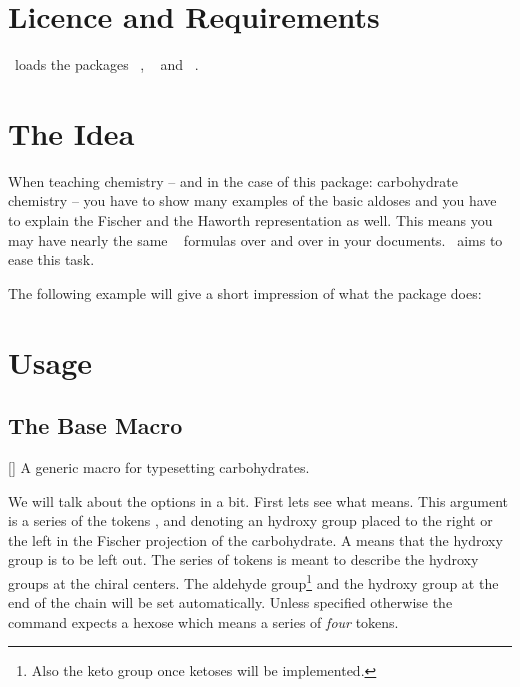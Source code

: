 \documentclass[load-preamble+]{cnltx-doc}
\begin{document}
\section{Licence and Requirements}
\license

\carbohydrates\ loads the packages ~\cite{pkg:chemfig},
~\cite{pkg:etoolbox} and ~\cite{pkg:xcolor}.

\section{The Idea}
When teaching chemistry -- and in the case of this package: carbohydrate
chemistry -- you have to show many examples of the basic aldoses and you have
to explain the Fischer and the Haworth representation as well. This means you
may have nearly the same ~\cite{pkg:chemfig} formulas over and
over in your documents.  \carbohydrates\ aims to ease this task.

The following example will give a short impression of what the package does:
\begin{example}
  \glucose
  \glucose[model={fischer=skeleton}]
  \setatomsep{2.5em}
  \glucose[model=haworth,ring]
  \glucose[model=haworth,ring=furanose]
\end{example}

\section{Usage}
\subsection{The Base Macro}
\begin{commands}
  []
    A generic macro for typesetting carbohydrates.
\end{commands}
We will talk about the options in a bit. First lets see what 
means.  This argument is a series of the tokens ,  and
 denoting an hydroxy group placed to the right or the left in the
Fischer projection of the carbohydrate.  A  means that the hydroxy
group is to be left out.  The series of tokens is meant to describe the
hydroxy groups at the chiral centers. The aldehyde group\footnote{Also the
  keto group once ketoses will be implemented.} and the hydroxy group at the
end of the chain will be set automatically.  Unless specified otherwise the
command expects a hexose which means a series of \emph{four} tokens.
\end{document}
